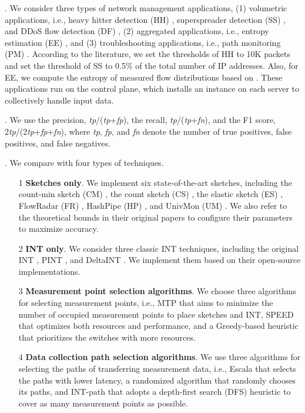 . We consider three types of network management applications, (1) volumetric applications, i.e., heavy hitter detection (HH) \cite{huang2017sketchvisor}, superspreader detection (SS) \cite{tang2019mv}, and DDoS flow detection (DF) \cite{liu2021jaqen}, (2) aggregated applications, i.e., entropy estimation (EE) \cite{liu2016one}, and (3) troubleshooting applications, i.e., path monitoring (PM) \cite{ben2020pint,sheng2021deltaint}. 
According to the literature, we set the thresholds of HH to 10K packets and set the threshold of SS to 0.5\% of the total number of IP addresses. Also, for EE, we compute the entropy of measured flow distributions based on \cite{liu2016one}. These applications run on the control plane, which installs an instance on each server to collectively handle input data. 

. We use the precision, \emph{tp}/(\emph{tp}+\emph{fp}), the recall, \emph{tp}/(\emph{tp}+\emph{fn}), and the F1 score, 2\emph{tp}/(2\emph{tp}+\emph{fp}+\emph{fn}), where \emph{tp}, \emph{fp}, and \emph{fn} denote the number of true positives, false positives, and false negatives. 


. We compare \sysname with four types of techniques. 

\begin{itemize}[leftmargin=*]
%
    \item[1] \textbf{Sketches only}. We implement six state-of-the-art sketches, including the count-min sketch (CM) \cite{cormode2005improved}, the count sketch (CS) \cite{charikar2004finding}, the elastic sketch (ES) \cite{yang2018elastic}, FlowRadar (FR) \cite{li2016flowradar}, HashPipe (HP) \cite{sivaraman2017heavy}, and UnivMon (UM) \cite{liu2016one}. We also refer to the theoretical bounds in their original papers to configure their parameters to maximize accuracy. %
%
    \item[2] \textbf{INT only}. We consider three classic INT techniques, including the original INT \cite{int}, PINT \cite{ben2020pint}, and DeltaINT \cite{sheng2021deltaint}. We implement them based on their open-source implementations. %
%
    \item[3] \textbf{Measurement point selection algorithms}. We choose three algorithms for selecting measurement points, i.e., MTP \cite{chen2021mtp} that aims to minimize the number of occupied measurement points to place sketches and INT, SPEED \cite{chen2020speed} that optimizes both resources and performance, and a Greedy-based heuristic that prioritizes the switches with more resources. 
%
    \item[4] \textbf{Data collection path selection algorithms}. We use three algorithms for selecting the paths of transferring measurement data, i.e., Escala \cite{liu2022escala} that selects the paths with lower latency, a randomized algorithm that randomly chooses its paths, and INT-path \cite{pan2019int} that adopts a depth-first search (DFS) heuristic to cover as many measurement points as possible.
%
\end{itemize}

